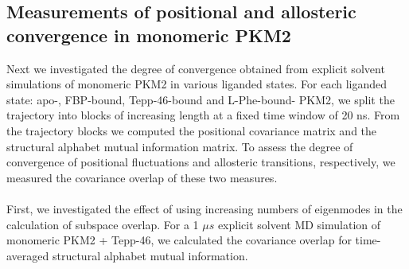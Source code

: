 \documentclass[11pt]{article}
\begin{document}
\subsection*{Measurements of positional and allosteric convergence in monomeric PKM2}
Next we investigated the degree of convergence obtained from explicit solvent simulations of monomeric PKM2 in various liganded states. For each liganded state: apo-, FBP-bound, Tepp-46-bound and L-Phe-bound- PKM2, we split the trajectory into blocks of increasing length at a fixed time window of 20 ns. From the trajectory blocks we computed the positional covariance matrix and the structural alphabet mutual information matrix. To assess the degree of convergence of positional fluctuations and allosteric transitions, respectively, we measured the covariance overlap of these two measures.
\\
\\
First, we investigated the effect of using increasing numbers of eigenmodes in the calculation of subspace overlap. For a 1 $\mu s$ explicit solvent MD simulation of monomeric PKM2 + Tepp-46, we calculated the covariance overlap for time-averaged structural alphabet mutual information.
\end{document}
